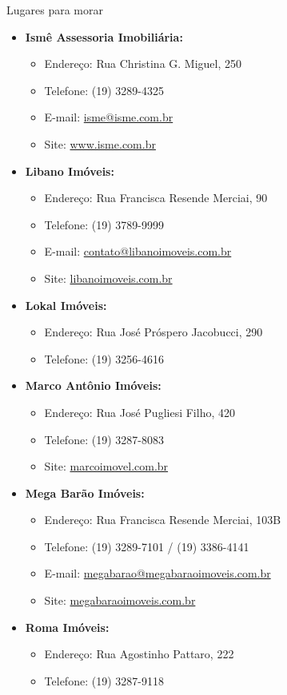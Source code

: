 \begin{story}{Lugares para morar}
\begin{itemize}
\item \textbf{Ismê Assessoria Imobiliária:}
\begin{itemize}
\item Endereço: Rua Christina G. Miguel, 250
\item Telefone: (19) 3289-4325
\item E-mail: \url{isme@isme.com.br}
\item Site: \url{www.isme.com.br}
\end{itemize}

\item \textbf{Libano Imóveis:}
\begin{itemize}
\item Endereço: Rua Francisca Resende Merciai, 90
\item Telefone: (19) 3789-9999
\item E-mail: \url{contato@libanoimoveis.com.br}
\item Site: \url{libanoimoveis.com.br}
\end{itemize}

\item \textbf{Lokal Imóveis:}
\begin{itemize}
\item Endereço: Rua José Próspero Jacobucci, 290
\item Telefone: (19) 3256-4616
\end{itemize}

\item \textbf{Marco Antônio Imóveis:}
\begin{itemize}
\item Endereço: Rua José Pugliesi Filho, 420
\item Telefone: (19) 3287-8083
\item Site: \url{marcoimovel.com.br}
\end{itemize}

\item \textbf{Mega Barão Imóveis:}
\begin{itemize}
\item Endereço: Rua Francisca Resende Merciai, 103B
\item Telefone: (19) 3289-7101 / (19) 3386-4141
\item E-mail: \url{megabarao@megabaraoimoveis.com.br}
\item Site: \url{megabaraoimoveis.com.br}
\end{itemize}

\item \textbf{Roma Imóveis:}
\begin{itemize}
\item Endereço: Rua Agostinho Pattaro, 222
\item Telefone: (19) 3287-9118
\end{itemize}


\end{itemize}
\end{story}
